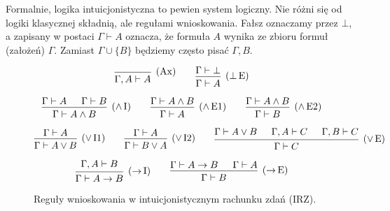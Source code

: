\documentclass[polish,pretty]{angav}
\begin{document}
Formalnie, logika intuicjonistyczna to pewien system logiczny. Nie różni się od logiki klasycznej składnią, ale regułami wnioskowania.
Fałsz oznaczamy przez $\bot$, a  zapisany w postaci $\Gamma \vdash A$ oznacza, że formuła $A$ wynika ze zbioru formuł (założeń) $\Gamma$.
Zamiast $\Gamma \cup \{B\}$ będziemy często pisać $\Gamma, B$.

\begin{figure}[H]
    \[
    \begin{prooftree}
        \infer0[(Ax)]{\Gamma,A\vdash A}
    \end{prooftree}
    \qquad
    \begin{prooftree}
        \hypo{\Gamma\vdash \bot}
        \infer1[($\bot\!$ E)]{\Gamma\vdash A}
    \end{prooftree}
    \]

    \[
    \begin{prooftree}
        \hypo{\Gamma\vdash A}
        \hypo{\Gamma\vdash B}
        \infer2[($\land\!$ I)]{\Gamma\vdash A \land B}
    \end{prooftree}
    \qquad
    \begin{prooftree}
        \hypo{\Gamma\vdash A \land B}
        \infer1[($\land\!$ E1)]{\Gamma\vdash A}
    \end{prooftree}
    \qquad
    \begin{prooftree}
        \hypo{\Gamma\vdash A \land B}
        \infer1[($\land\!$ E2)]{\Gamma\vdash B}
    \end{prooftree}
    \]

    \[
    \begin{prooftree}
        \hypo{\Gamma\vdash A}
        \infer1[($\lor\!$ I1)]{\Gamma\vdash A \lor B}
    \end{prooftree}
    \qquad
    \begin{prooftree}
        \hypo{\Gamma\vdash A}
        \infer1[($\lor\!$ I2)]{\Gamma\vdash B \lor A}
    \end{prooftree}
    \qquad
    \begin{prooftree}
        \hypo{\Gamma\vdash A \lor B}
        \hypo{\Gamma,A\vdash C}
        \hypo{\Gamma,B\vdash C}
        \infer3[($\lor\!$ E)]{\Gamma\vdash C}
    \end{prooftree}
    \]

    \[
    \begin{prooftree}
        \hypo{\Gamma,A\vdash B}
        \infer1[($\to\!$ I)]{\Gamma\vdash A \to B}
    \end{prooftree}
    \qquad
    \begin{prooftree}
        \hypo{\Gamma\vdash A \to B}
        \hypo{\Gamma\vdash A}
        \infer2[($\to\!$ E)]{\Gamma\vdash B}
    \end{prooftree}
    \]
    \caption{Reguły wnioskowania w intuicjonistycznym rachunku zdań (IRZ).}
\end{figure}
\end{document}
